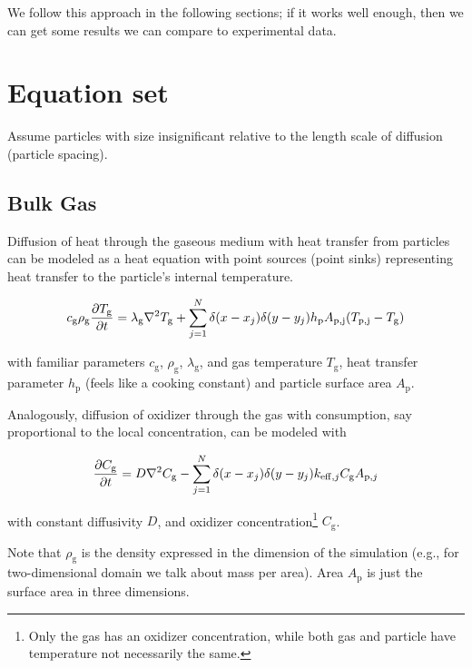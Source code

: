 \documentclass{article}
\begin{document}
We follow this approach in the following sections; if it works well enough, then we can get some results we can compare to experimental data. 

\section{Equation set}

Assume particles with size insignificant relative to the length scale of diffusion (particle spacing).

\subsection{Bulk Gas}

Diffusion of heat through the gaseous medium with heat transfer from particles can be modeled as a heat equation with point sources (point sinks) representing heat transfer to the particle's internal temperature.

\begin{equation}
    c_\mathrm{g} \rho_\mathrm{g} \frac{\partial T_\mathrm{g}}{\partial t} = \lambda_\mathrm{g} \nabla^2 T_\mathrm{g} + \sum_{j = 1}^N \delta(x-x_j)\delta(y-y_j) h_\mathrm{p} A_\mathrm{p,j} (T_\mathrm{p,j} - T_\mathrm{g})
\end{equation}

with familiar parameters $c_\mathrm{g}$, $\rho_\mathrm{g}$, $\lambda_\mathrm{g}$, and gas temperature $T_\mathrm{g}$, heat transfer parameter $h_\mathrm{p}$ (feels like a cooking constant) and particle surface area $A_\mathrm{p}$.

Analogously, diffusion of oxidizer through the gas with consumption, say proportional to the local concentration, can be modeled with

\begin{equation}
    \frac{\partial C_\mathrm{g}}{\partial t} = D \nabla^2 C_\mathrm{g} - \sum_{j = 1}^N \delta(x-x_j)\delta(y-y_j) k_{\mathrm{eff},j} C_\mathrm{g} A_{\mathrm{p},j}
\end{equation}

with constant diffusivity $D$, and oxidizer concentration\footnote{Only the gas has an oxidizer concentration, while both gas and particle have temperature not necessarily the same.} $C_\mathrm{g}$.

Note that $\rho_\mathrm{g}$ is the density expressed in the dimension of the simulation (e.g., for two-dimensional domain we talk about mass per area). Area $A_\mathrm{p}$ is just the surface area in three dimensions.
\end{document}
